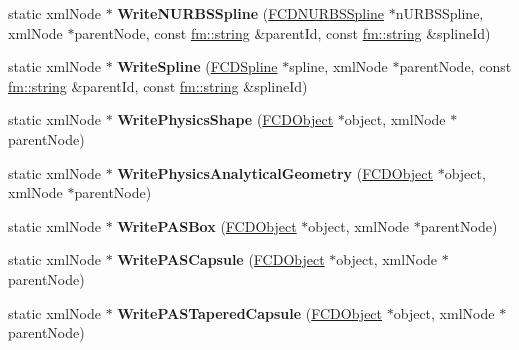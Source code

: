 \begin{DoxyCompactItemize}
\item 
\hypertarget{classFArchiveXML_ace3dfa56ddb6c946e091ff8d660815f4}{
static xmlNode $\ast$ {\bfseries WriteNURBSSpline} (\hyperlink{classFCDNURBSSpline}{FCDNURBSSpline} $\ast$nURBSSpline, xmlNode $\ast$parentNode, const \hyperlink{classfm_1_1stringT}{fm::string} \&parentId, const \hyperlink{classfm_1_1stringT}{fm::string} \&splineId)}
\label{classFArchiveXML_ace3dfa56ddb6c946e091ff8d660815f4}

\item 
\hypertarget{classFArchiveXML_abcf93b607f671d8d78896642de2e7961}{
static xmlNode $\ast$ {\bfseries WriteSpline} (\hyperlink{classFCDSpline}{FCDSpline} $\ast$spline, xmlNode $\ast$parentNode, const \hyperlink{classfm_1_1stringT}{fm::string} \&parentId, const \hyperlink{classfm_1_1stringT}{fm::string} \&splineId)}
\label{classFArchiveXML_abcf93b607f671d8d78896642de2e7961}

\item 
\hypertarget{classFArchiveXML_a14bbd15a8629ef5cabded8c31f255e11}{
static xmlNode $\ast$ {\bfseries WritePhysicsShape} (\hyperlink{classFCDObject}{FCDObject} $\ast$object, xmlNode $\ast$parentNode)}
\label{classFArchiveXML_a14bbd15a8629ef5cabded8c31f255e11}

\item 
\hypertarget{classFArchiveXML_a04a77356b182ae7b11ceb0555383dd8c}{
static xmlNode $\ast$ {\bfseries WritePhysicsAnalyticalGeometry} (\hyperlink{classFCDObject}{FCDObject} $\ast$object, xmlNode $\ast$parentNode)}
\label{classFArchiveXML_a04a77356b182ae7b11ceb0555383dd8c}

\item 
\hypertarget{classFArchiveXML_aa791278978c08870c5e635223bda7efa}{
static xmlNode $\ast$ {\bfseries WritePASBox} (\hyperlink{classFCDObject}{FCDObject} $\ast$object, xmlNode $\ast$parentNode)}
\label{classFArchiveXML_aa791278978c08870c5e635223bda7efa}

\item 
\hypertarget{classFArchiveXML_a14d67110179c5b47581167ea87fc2561}{
static xmlNode $\ast$ {\bfseries WritePASCapsule} (\hyperlink{classFCDObject}{FCDObject} $\ast$object, xmlNode $\ast$parentNode)}
\label{classFArchiveXML_a14d67110179c5b47581167ea87fc2561}

\item 
\hypertarget{classFArchiveXML_aff6d80d14f259327443234f7c48c5ae2}{
static xmlNode $\ast$ {\bfseries WritePASTaperedCapsule} (\hyperlink{classFCDObject}{FCDObject} $\ast$object, xmlNode $\ast$parentNode)}
\label{classFArchiveXML_aff6d80d14f259327443234f7c48c5ae2}


\end{DoxyCompactItemize}
